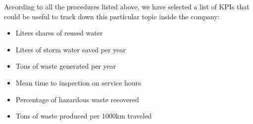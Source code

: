 According to all the procedures listed above, we have selected a list of KPIs that could be useful to track down this particular topic inside the company:

\begin{itemize}
    \item Liters shares of reused water
    \item Liters of storm water saved per year
    \item Tons of waste generated per year
    \item Mean time to inspection on service hours
    \item Percentage of hazardous waste recovered
    \item Tons of waste produced per 1000km traveled
\end{itemize}




